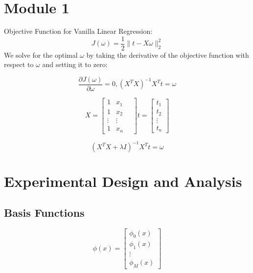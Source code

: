 \documentclass[10pt]{article}
\begin{document}
\begin{multicols}{2}
\section*{Module 1}
Objective Function for Vanilla Linear Regression:
\begin{equation}
    J(\omega) = \frac{1}{2} \lVert{t - X\omega} \rVert^{2}_{2}
\end{equation}
We solve for the optimal $\omega$ by taking the derivative of the objective function with respect to $\omega$ and setting it to zero:

\begin{equation}
    \frac{\partial J(\omega)}{\partial \omega} = 0, (X^{T}X)^{-1}X^{T}t = \omega
\end{equation}

\begin{equation} \label{eq:feature-target}
    X = \begin{bmatrix} 
    1 & x_{1} \\
    1 & x_{2} \\
    \vdots & \vdots \\
    1 & x_{n}
    \quad
    \end{bmatrix}
    t = \begin{bmatrix}
    t_{1} \\
    t_{2} \\
    \vdots \\
    t_{n}
    \end{bmatrix}
\end{equation}

\begin{equation}
    \label{eq:ridge}
    (X^{T}X + \lambda I)^{-1}X^{T}t = \omega
\end{equation}

\section*{Experimental Design and Analysis}
\subsection*{Basis Functions}

\begin{equation}
    \phi(x) = \begin{bmatrix}
    \phi_{0}(x) \\
    \phi_{1}(x) \\
    \vdots \\
    \phi_{M}(x)
    \end{bmatrix}
\end{equation}


\end{multicols}
\end{document}
